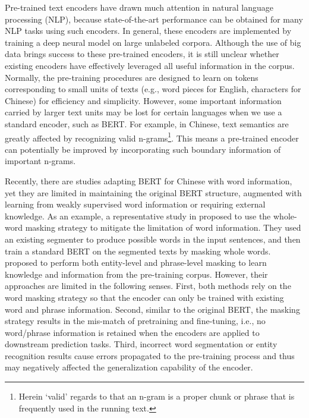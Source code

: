\documentclass[11pt,a4paper]{article}
\begin{document}
\begin{CJK}{UTF8}{gbsn}
Pre-trained text encoders \cite{peters2018deep, devlin2018bert, radford2018improving, radford2019language, yang2019xlnet} have drawn much attention in natural language processing (NLP),
because state-of-the-art performance can be obtained for many NLP tasks using such encoders.
In general, these encoders are implemented by training a deep neural model on large unlabeled corpora. Although the use of big data brings success to these pre-trained encoders, it is still unclear whether existing encoders have effectively leveraged all useful information in the corpus.
Normally, the pre-training procedures are designed to learn on tokens corresponding to small units of texts (e.g., word pieces for English, characters for Chinese) for efficiency and simplicity. However, some important information carried by larger text units may be lost for certain languages when we use a standard encoder, such as BERT.
For example, in Chinese, text semantics are greatly affected by recognizing valid n-grams\footnote{Herein `valid' regards to that an n-gram is a proper chunk or phrase that is frequently used in the running text.}. This means a pre-trained encoder can potentially be improved by incorporating such boundary information of important n-grams.


Recently, there are studies adapting BERT for Chinese with word information, yet they are limited in maintaining the original BERT structure, augmented with learning from weakly supervised word information or requiring external knowledge.
As an example, a representative study in \citet{cui2019pre} proposed to use the whole-word masking strategy to mitigate the limitation of word information. 
They used an existing segmenter to produce possible words in the input sentences, and then train a standard BERT on the segmented texts by masking whole words.
\citet{sun2019ernie} proposed to perform both entity-level and phrase-level masking to learn knowledge and information from the pre-training corpus.
However, their approaches are limited in the following senses.
First, both methods rely on the word masking strategy so that the encoder can only be trained with existing word and phrase information. Second,
similar to the original BERT, the masking strategy results in the mis-match of pretraining and fine-tuning, i.e.,
no word/phrase information is retained when the encoders are applied to downstream prediction tasks. 
Third, incorrect word segmentation or entity recognition results cause errors propagated to the pre-training process and thus may negatively affected the generalization capability of the encoder.



\end{CJK}
\end{document}
